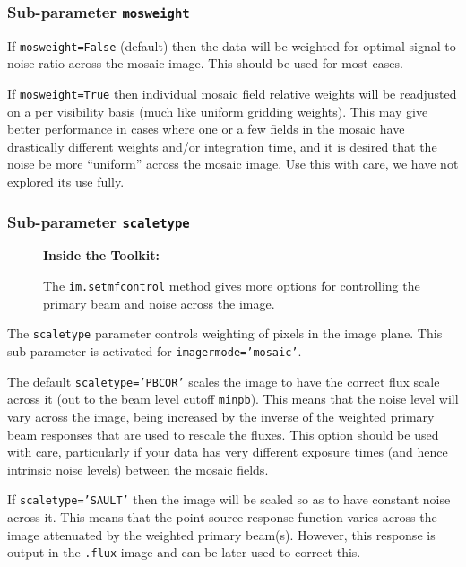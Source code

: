 \subsubsection{Sub-parameter {\tt mosweight} }
\label{section:im.imagermode.mosaic.mosweight}

If {\tt mosweight=False} (default) then the data will be
weighted for optimal signal to noise ratio across the mosaic image. 
This should be used for most cases.

If {\tt mosweight=True} then individual mosaic field relative weights
will be readjusted on a per visibility basis (much like uniform
gridding weights).  This may give better performance in cases where
one or a few fields in the mosaic have drastically different weights
and/or integration time, and it is desired that the noise be more
``uniform'' across the mosaic image.  Use this with care, we have
not explored its use fully.

\subsubsection{Sub-parameter {\tt scaletype} }
\label{section:im.clean.imagermode.scaletype}

\begin{wrapfigure}{r}{2.5in}
  \begin{boxedminipage}{2.5in}
     \centerline{\bf Inside the Toolkit:}
     The {\tt im.setmfcontrol} method gives more options for
     controlling the primary beam and noise across the image.
  \end{boxedminipage}
\end{wrapfigure}

The {\tt scaletype} parameter controls weighting of pixels in the 
image plane.  This sub-parameter is activated for {\tt imagermode='mosaic'}.

The default {\tt scaletype='PBCOR'} scales the
image to have the correct flux scale across it (out to the beam
level cutoff {\tt minpb}).  This means that the noise level will
vary across the image, being increased by the inverse of the 
weighted primary beam responses that are used to rescale the
fluxes.  This option should
be used with care, particularly if your data has very different exposure
times (and hence intrinsic noise levels) between the mosaic fields.

If {\tt scaletype='SAULT'} then the image will be scaled so as to have
constant noise across it.  This means that the point source response
function varies across the image attenuated by the weighted primary
beam(s).  However, this response is output in the {\tt .flux} image
and can be later used to correct this.

